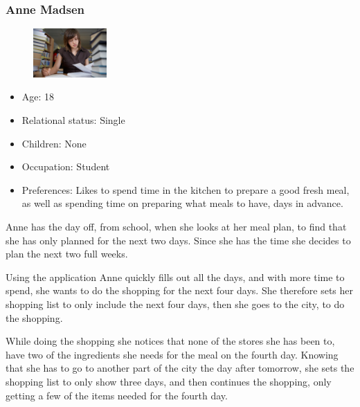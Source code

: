 \subsubsection{Anne Madsen}
\begin{figure}[H]
	\includegraphics[width=0.25\textwidth]{Grafik/FoodPlanner/PersonaAnneMadsen}
	\label{PersonaHenrikJensen}
\end{figure}
\begin{itemize}
	\item Age: 18
	\item Relational status: Single
	\item Children: None
	\item Occupation: Student
	\item Preferences: Likes to spend time in the kitchen to prepare a good fresh meal, as well as spending time on preparing what meals to have, days in advance.
\end{itemize}
Anne has the day off, from school, when she looks at her meal plan, to find that she has only planned for the next two days. Since she has the time she decides to plan the next two full weeks.

Using the application Anne quickly fills out all the days, and with more time to spend, she wants to do the shopping for the next four days. She therefore sets her shopping list to only include the next four days, then she goes to the city, to do the shopping.

While doing the shopping she notices that none of the stores she has been to, have two of the ingredients she needs for the meal on the fourth day. Knowing that she has to go to another part of the city the day after tomorrow, she sets the shopping list to only show three days, and then continues the shopping, only getting a few of the items needed for the fourth day.